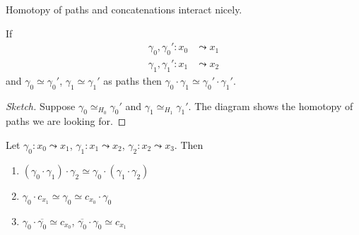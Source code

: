 \documentclass{article}
\numberwithin{nthm}{subsection}
\begin{document}

Homotopy of paths and concatenations interact nicely.

\begin{lemma}
    If
    \begin{align*}
        \gamma_0,\gamma_0': x_0 &\leadsto x_1 \\
        \gamma_1,\gamma_1': x_1 &\leadsto x_2
    \end{align*}
    and $\gamma_0 \simeq \gamma_0'$, $\gamma_1 \simeq \gamma_1'$ as paths then $\gamma_0 \cdot \gamma_1 \simeq \gamma_0' \cdot \gamma_1'$.
\end{lemma}

\begin{proof}[Sketch]
    Suppose $\gamma_0 \simeq_{H_0} \gamma_0'$ and $\gamma_1 \simeq_{H_1} \gamma_1'$.
    The diagram shows the homotopy of paths we are looking for.
\end{proof}

\begin{prop}
    Let $\gamma_0:x_0 \leadsto x_1$, $\gamma_1: x_1 \leadsto x_2$, $\gamma_2: x_2 \leadsto x_3$.
    Then
    \begin{enumerate}[label=(\roman*)]
        \item $(\gamma_0 \cdot \gamma_1) \cdot \gamma_2 \simeq \gamma_0 \cdot (\gamma_1 \cdot \gamma_2)$
        \item $\gamma_0 \cdot c_{x_1} \simeq \gamma_0 \simeq c_{x_0} \cdot \gamma_0$
        \item $\gamma_0 \cdot \overline{\gamma_0} \simeq c_{x_0}$, $\overline{\gamma_0} \cdot \gamma_0 \simeq c_{x_1}$
    \end{enumerate}
\end{prop}
\end{document}
